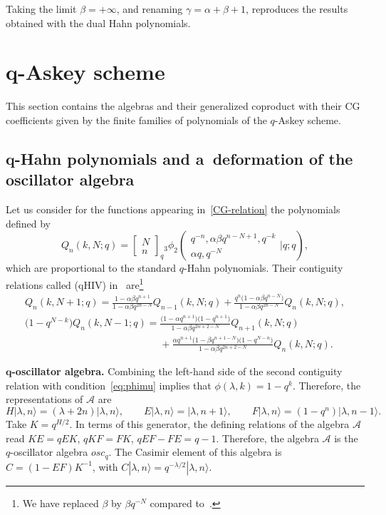\documentclass[10pt,a4paper]{amsart}
\numberwithin{equation}{section}
\theoremstyle{definition}
\begin{document}
Taking the limit $\beta=+\infty$, and renaming $\gamma=\alpha+\beta+1$, reproduces the results obtained with the dual Hahn polynomials.

\section[q-Askey scheme]{$\boldsymbol{q}$-Askey scheme}\label{sec:qaskey}

This section contains the algebras and their generalized coproduct with their CG coefficients given by the finite families of polynomials of the $q$-Askey scheme.

\subsection[q-Hahn polynomials and a~deformation of the oscillator algebra]{$\boldsymbol{q}$-Hahn polynomials and a~deformation of the oscillator algebra}

Let us consider for the functions appearing in~\eqref{CG-relation} the polynomials defined by
\[Q_n(k,N;q)=
\left[\begin{array}{c} N \\ n \end{array}\right]_q
{}_3\phi_2\left(\begin{array}{c} q^{-n}, \alpha\beta q^{n-N+1}, q^{-k} \\ \alpha q, q^{-N}\end{array}\Bigg\vert q;q\right),\]
which are proportional to the standard $q$-Hahn polynomials.
Their contiguity relations called (qHIV) in~\cite{contiguity} are\footnote{We have replaced $\beta$ by $\beta q^{-N}$ compared to~\cite{contiguity}.}
\begin{gather*}
Q_n(k,N+1;q)=\frac{1-\alpha\beta q^{n+1}}{1-\alpha\beta q^{2n-N}}Q_{n-1}(k,N;q)+\frac{q^n\bigl(1-\alpha\beta q^{n-N}\bigr)}{1-\alpha\beta q^{2n-N}}Q_n(k,N;q),\\
\bigl(1-q^{N-k}\bigr)Q_n(k,N-1;q)=\frac{\bigl(1-\alpha q^{n+1}\bigr)\bigl(1-q^{n+1}\bigr)}{1-\alpha\beta q^{2n+2-N}}Q_{n+1}(k,N;q)\\
\phantom{\bigl(1-q^{N-k}\bigr)Q_n(k,N-1;q)=}{}+\frac{\alpha q^{n+1}\bigl(1-\beta q^{n+1-N}\bigr)\bigl(1-q^{N-n}\bigr)}{1-\alpha\beta q^{2n+2-N}}Q_n(k,N;q).
\end{gather*}


{\bf $\boldsymbol{q}$-oscillator algebra.} Combining the left-hand side of the second contiguity relation with condition~\eqref{eq:phimu} implies that
$\phi(\lambda,k)=1-q^k$.
Therefore, the representations of $\mathcal{A}$ are
\[H|\lambda,n\rangle=(\lambda+2n)|\lambda,n\rangle, \qquad
E|\lambda,n\rangle=|\lambda,n+1\rangle, \qquad
F|\lambda,n\rangle=(1-q^n)|\lambda,n-1\rangle.\]
Take $ K=q^{H/2}$.
In terms of this generator, the defining relations of the algebra $\mathcal{A}$ read
$
KE=q EK$, $ q KF=FK$, $ qEF-FE=q-1$.
Therefore, the algebra $\mathcal{A}$ is the $q$-oscillator algebra $osc_q$.
The Casimir element of this algebra is~${C=(1-EF)K^{-1}}$, with $C|\lambda,n\rangle=q^{-\lambda/2}|\lambda,n\rangle $.
\end{document}
